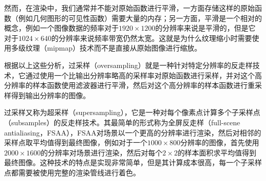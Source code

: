 然而，在渲染中，我们通常并不能对原始函数进行平滑，一方面存储这样的原始函数（例如几何图形的可见性函数）需要大量的内存；另一方面，平滑是一个相对的概念，例如一个图像数据的频率对于$1920\times 1200$的分辨率来说是平滑的，但是它对于$1024\times 640$的分辨率来说频率带宽仍然太宽。这就是为什么纹理缩小时需要使用多级纹理（mipmap）技术而不是直接从原始图像进行缩放。

根据以上这些分析，过采样（oversampling）就是一种针对特定分辨率的反走样技术，它通过使用一个比输出分辨率略高的采样率对原始函数进行采样，并对这个高分辨率的样本函数使用滤波器进行平滑，然后对这个高分辨率的样本函数进行重采样得到输出分辨率的图像。

过采样又称为超采样（supersampling），它是一种对每个像素点计算多个子采样点（subsamples）的反走样技术。其最简单的形式称为全屏反走样（full-scene antialiasing，FSAA），FSAA对场景以一个更高的分辨率进行渲染，然后对相邻的采样点取平均值得到最终图像，例如对于一个$1000\times 800$分辨率的图像，首先使用$2000\times 1600$的分辨率对场景进行渲染，然后对每个$2\times 2$的样本面积求平均值得到最终图像。这种技术的特点是实现非常简单，但是其计算成本很高，每一个子采样点都需要被使用完整的渲染管线进行着色。

